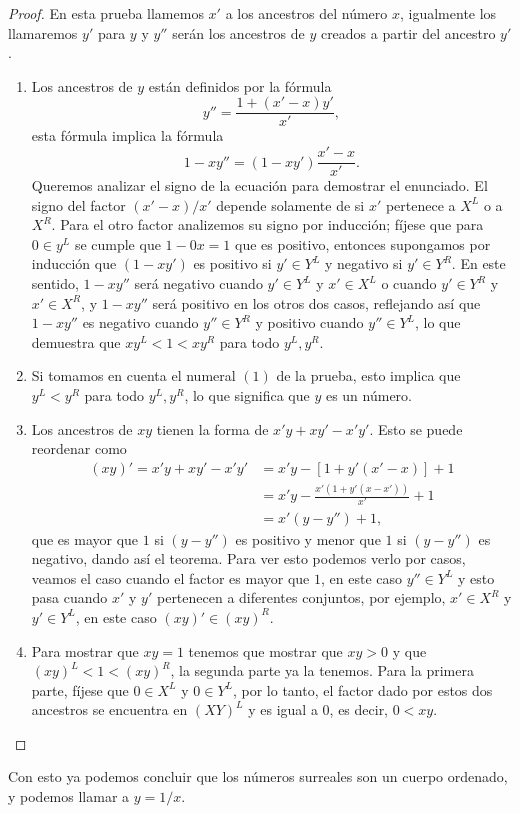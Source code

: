     \begin{proof}
        En esta prueba llamemos $x'$ a los ancestros del n\'umero $x$, igualmente los llamaremos $y'$ para $y$ y $y''$ ser\'an los ancestros de $y$ creados a partir del ancestro $y'$.
        \begin{enumerate}
            \item Los ancestros de $y$ est\'an definidos por la f\'ormula
            \[
                y'' = \frac{1+(x'-x)y'}{x'},
            \]
            esta f\'ormula implica la f\'ormula
            \[
                1-xy'' = (1-xy')\frac{x'-x}{x'}.
            \]
            Queremos analizar el signo de la ecuaci\'on para demostrar el enunciado. El signo del factor $(x'-x)/x'$ depende solamente de si $x'$ pertenece a $X^L$ o a $X^R$. Para el otro factor analizemos su signo por inducci\'on; f\'ijese que para $0\in y^L$ se cumple que $1-0x = 1$ que es positivo, entonces supongamos por inducci\'on que $(1-xy')$ es positivo si $y'\in Y^L$ y negativo si $y'\in Y^R$. En este sentido, $1-xy''$ ser\'a negativo cuando $y'\in Y^L$ y $x'\in X^L$ o cuando $y'\in Y^R$ y $x' \in X^R$, y $1-xy''$ ser\'a positivo en los otros dos casos, reflejando as\'i que $1-xy''$ es negativo cuando $y''\in Y^R$ y positivo cuando $y''\in Y^L$, lo que demuestra que $xy^L < 1 < xy^R$ para todo $y^L, y^R$.

            \item Si tomamos en cuenta el numeral $(1)$ de la prueba, esto implica que $y^L < y^R$ para todo $y^L, y^R$, lo que significa que $y$ es un n\'umero.
            
            \item Los ancestros de $xy$ tienen la forma de $x'y + xy' - x'y'$. Esto se puede reordenar como 
            \begin{align*}
                (xy)' = x'y + xy' - x'y' & =  x'y -\left[1 + y'(x'-x)\right] + 1 \\
                & = x'y - \frac{x'(1 + y'(x-x'))}{x'} + 1 \\
                & = x'(y - y'') + 1,
            \end{align*}
            que es mayor que $1$ si $(y-y'')$ es positivo y menor que $1$ si $(y-y'')$ es negativo, dando as\'i el teorema. Para ver esto podemos verlo por casos, veamos el caso cuando el factor es mayor que $1$, en este caso $y''\in Y^L$ y esto pasa cuando $x'$ y $y'$ pertenecen a diferentes conjuntos, por ejemplo, $x'\in X^R$ y $y'\in Y^L$, en este caso $(xy)'\in (xy)^R$.

            \item Para mostrar que $xy=1$ tenemos que mostrar que $xy > 0$ y que $(xy)^L < 1 < (xy)^R$, la segunda parte ya la tenemos. Para la primera parte, f\'ijese que $0\in X^L$ y $0\in Y^L$, por lo tanto, el factor dado por estos dos ancestros se encuentra en $(XY)^L$ y es igual a $0$, es decir, $0 < xy$.
        \end{enumerate}
    \end{proof}

    Con esto ya podemos concluir que los n\'umeros surreales son un cuerpo ordenado, y podemos llamar a $y = 1/x$.